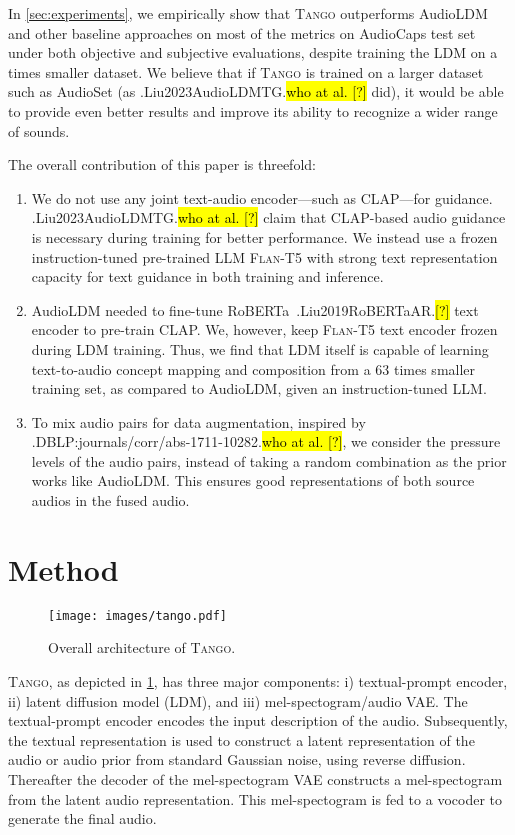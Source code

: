 \documentclass{article}
\newcommand{\model}{\textsc{Tango}}
\let\realcite\cite
\renewcommand{\cite}[1]{\ifx.#1.\hl{[?]}\else\realcite{#1}\fi}
\let\realcitet\citet
\renewcommand{\citet}[1]{\ifx.#1.\hl{who at al. [?]}\else\realcitet{#1}\fi}
\begin{document}
In \cref{sec:experiments}, we empirically show that \model {} outperforms AudioLDM and other baseline approaches on most of the metrics on AudioCaps test set under both objective and subjective evaluations, despite training the LDM on a  times smaller dataset. We believe that if \model{} is trained on a larger dataset such as AudioSet (as \citet{Liu2023AudioLDMTG} did), it would be able to provide even better results and improve its ability to recognize a wider range of sounds.

The overall contribution of this paper is threefold:
\begin{enumerate}[leftmargin=*, wide, labelwidth=0pt, labelindent=0pt]
    \item We do not use any joint text-audio encoder---such as CLAP---for guidance. \citet{Liu2023AudioLDMTG} claim that CLAP-based audio guidance is necessary during training for better performance. We instead use a frozen instruction-tuned pre-trained LLM \textsc{Flan-T5} with strong text representation capacity for text guidance in both training and inference.
    \item AudioLDM needed to fine-tune RoBERTa~\cite{Liu2019RoBERTaAR} text encoder to pre-train CLAP. We, however, keep \textsc{Flan-T5} text encoder frozen during LDM training. Thus, we find that LDM itself is capable of learning text-to-audio concept mapping and composition from a 63 times smaller training set, as compared to AudioLDM, given an instruction-tuned LLM.
    \item To mix audio pairs for data augmentation, inspired by \citet{DBLP:journals/corr/abs-1711-10282}, we consider the pressure levels of the audio pairs, instead of taking a random combination as the prior works like AudioLDM. This ensures good representations of both source audios in the fused audio.
\end{enumerate}





\section{Method}

\begin{figure}
    \centering
    \texttt{[image: images/tango.pdf]}
    \caption{Overall architecture of \model{}.}
    \label{fig:model}
\end{figure}

\model{}, as depicted in \cref{fig:model}, has three major components: i) textual-prompt encoder, ii) latent diffusion model (LDM), and iii) mel-spectogram/audio VAE. The textual-prompt encoder encodes the input description of the audio. Subsequently, the textual representation is used to construct a latent representation of the audio or audio prior from standard Gaussian noise, using reverse diffusion. Thereafter the decoder of the mel-spectogram VAE constructs a mel-spectogram from the latent audio representation. This mel-spectogram is fed to a vocoder to generate the final audio.
\end{document}
